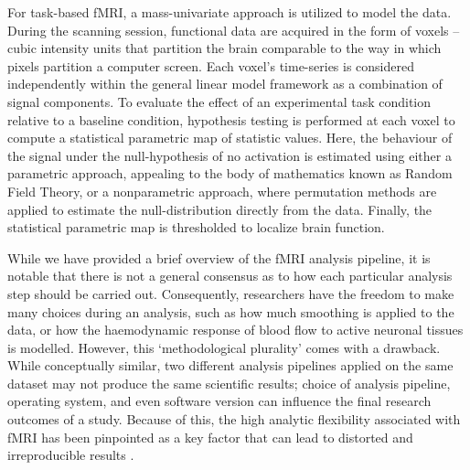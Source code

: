 For task-based fMRI, a mass-univariate approach is utilized to model the data. During the scanning session, functional data are acquired in the form of voxels -- cubic intensity units that partition the brain comparable to the way in which pixels partition a computer screen. Each voxel's time-series is considered independently within the general linear model framework as a combination of signal components. To evaluate the effect of an experimental task condition relative to a baseline condition, hypothesis testing is performed at each voxel to compute a statistical parametric map of statistic values. Here, the behaviour of the signal under the null-hypothesis of no activation is estimated using either a parametric approach, appealing to the body of mathematics known as Random Field Theory, or a nonparametric approach, where permutation methods are applied to estimate the null-distribution directly from the data. Finally, the statistical parametric map is thresholded to localize brain function. 

While we have provided a brief overview of the fMRI analysis pipeline, it is notable that there is not a general consensus as to how each particular analysis step should be carried out. Consequently, researchers have the freedom to make many choices during an analysis, such as how much smoothing is applied to the data, or how the haemodynamic response of blood flow to active neuronal tissues is modelled. However, this `methodological plurality' comes with a drawback. While conceptually similar, two different analysis pipelines applied on the same dataset may not produce the same scientific results; choice of analysis pipeline, operating system, and even software version can influence the final research outcomes of a study. Because of this, the high analytic flexibility associated with fMRI has been pinpointed as a key factor that can lead to distorted and irreproducible results \citep{Hong2019-qr,Ioannidis2005-sy,Wager2009-gm}. 



